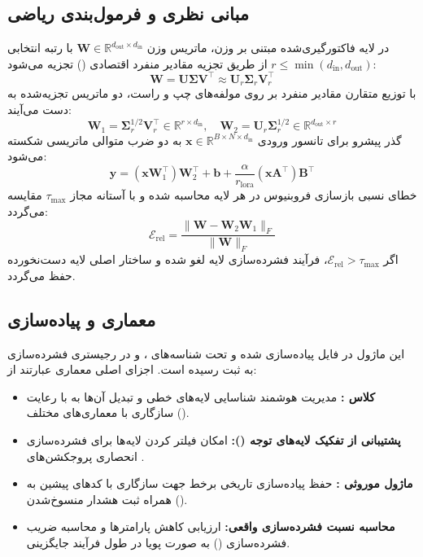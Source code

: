 \subsection{مبانی نظری و فرمول‌بندی ریاضی}
در لایه فاکتورگیری‌شده مبتنی بر وزن، ماتریس وزن $\mathbf{W} \in \mathbb{R}^{d_{\text{out}} \times d_{\text{in}}}$ با رتبه انتخابی $r \le \min(d_{\text{in}}, d_{\text{out}})$ از طریق تجزیه مقادیر منفرد اقتصادی () تجزیه می‌شود:
\begin{equation}
\mathbf{W} = \mathbf{U} \mathbf{\Sigma} \mathbf{V}^\top \approx \mathbf{U}_r \mathbf{\Sigma}_r \mathbf{V}_r^\top
\end{equation}
با توزیع متقارن مقادیر منفرد بر روی مولفه‌های چپ و راست، دو ماتریس تجزیه‌شده به دست می‌آیند:
\begin{equation}
\mathbf{W}_1 = \mathbf{\Sigma}_r^{1/2} \mathbf{V}_r^\top \in \mathbb{R}^{r \times d_{\text{in}}}, \quad \mathbf{W}_2 = \mathbf{U}_r \mathbf{\Sigma}_r^{1/2} \in \mathbb{R}^{d_{\text{out}} \times r}
\end{equation}
گذر پیشرو برای تانسور ورودی $\mathbf{x} \in \mathbb{R}^{B \times N \times d_{\text{in}}}$ به دو ضرب متوالی ماتریسی شکسته می‌شود:
\begin{equation}
\mathbf{y} = (\mathbf{x} \mathbf{W}_1^\top) \mathbf{W}_2^\top + \mathbf{b} + \frac{\alpha}{r_{\text{lora}}} (\mathbf{x} \mathbf{A}^\top) \mathbf{B}^\top
\end{equation}
خطای نسبی بازسازی فروبنیوس در هر لایه محاسبه شده و با آستانه مجاز $\tau_{\text{max}}$ مقایسه می‌گردد:
\begin{equation}
\mathcal{E}_{\text{rel}} = \frac{\|\mathbf{W} - \mathbf{W}_2 \mathbf{W}_1\|_F}{\|\mathbf{W}\|_F}
\end{equation}
اگر $\mathcal{E}_{\text{rel}} > \tau_{\text{max}}$، فرآیند فشرده‌سازی لایه لغو شده و ساختار اصلی لایه دست‌نخورده حفظ می‌گردد.

\subsection{معماری و پیاده‌سازی}
این ماژول در فایل  پیاده‌سازی شده و تحت شناسه‌های ،  و  در رجیستری فشرده‌سازی به ثبت رسیده است. اجزای اصلی معماری عبارتند از:
\begin{itemize}
    \item \textbf{کلاس :} مدیریت هوشمند شناسایی لایه‌های خطی و تبدیل آن‌ها به  با رعایت سازگاری با معماری‌های مختلف ().
    \item \textbf{پشتیبانی از تفکیک لایه‌های توجه ():} امکان فیلتر کردن لایه‌ها برای فشرده‌سازی انحصاری پروجکشن‌های .
    \item \textbf{ماژول موروثی :} حفظ پیاده‌سازی تاریخی برخط جهت سازگاری با کدهای پیشین به همراه ثبت هشدار منسوخ‌شدن ().
    \item \textbf{محاسبه نسبت فشرده‌سازی واقعی:} ارزیابی کاهش پارامترها و محاسبه ضریب فشرده‌سازی () به صورت پویا در طول فرآیند جایگزینی.
\end{itemize}


